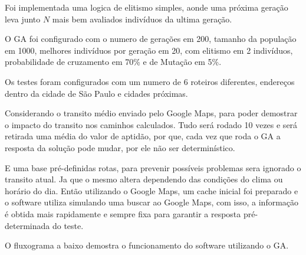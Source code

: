 Foi implementada  uma logica de elitismo simples, aonde uma próxima geração leva junto $N$ mais bem avaliados indivíduos da ultima geração.

O GA foi configurado com o numero de gerações em 200, tamanho da população em 1000, melhores indivíduos por geração em 20, com elitismo em 2 indivíduos, probabilidade de cruzamento em 70\% e de Mutação em 5\%.

Os testes foram configurados com um numero de 6 roteiros diferentes, endereços dentro da cidade de São Paulo e cidades próximas.

Considerando o transito médio enviado pelo Google Maps, para poder demostrar o impacto do transito nos caminhos calculados.
Tudo será rodado 10 vezes e será retirada uma média do valor de aptidão, por que, cada vez que roda o GA a resposta da solução pode mudar, por ele não ser determinístico.

E uma base pré-definidas rotas, para prevenir possíveis problemas sera ignorado o transito atual. Ja que o mesmo altera dependendo das condições do clima ou horário do dia. Então utilizando o Google Maps, um cache inicial foi preparado e o software utiliza simulando uma buscar ao Google Maps, com isso, a informação é obtida mais rapidamente e sempre fixa para garantir a resposta pré-determinada do teste.

O fluxograma a baixo demostra o funcionamento do software utilizando o GA.

\begin{center}
	\label{fig:FluxoGA}
\end{center}

